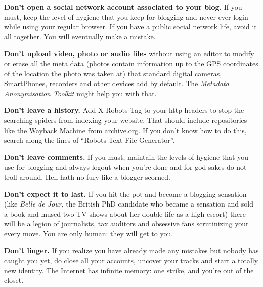 \textbf{Don't open a social network account associated to your blog.} If
you must, keep the level of hygiene that you keep for blogging and never
ever login while using your regular browser. If you have a public social
network life, avoid it all together. You will eventually make a mistake.

\textbf{Don't upload video, photo or audio files} without using an
editor to modify or erase all the meta data (photos contain information
up to the GPS coordinates of the location the photo was taken at) that
standard digital cameras, SmartPhones, recorders and other devices add
by default. The \emph{Metadata Anonymisation Toolkit} might help you
with that.

\textbf{Don't leave a history.} Add X-Robots-Tag to your http headers to
stop the searching spiders from indexing your website. That should
include repositories like the Wayback Machine from archive.org. If you
don't know how to do this, search along the lines of ``Robots Text File
Generator''.

\textbf{Don't leave comments.} If you must, maintain the levels of
hygiene that you use for blogging and always logout when you're done and
for god sakes do not troll around. Hell hath no fury like a blogger
scorned.

\textbf{Don't expect it to last.} If you hit the pot and become a
blogging sensation (like \emph{Belle de Jour}, the British PhD candidate
who became a sensation and sold a book and mused two TV shows about her
double life as a high escort) there will be a legion of journalists, tax
auditors and obsessive fans scrutinizing your every move. You are only
human: they will get to you.

\textbf{Don't linger.} If you realize you have already made any mistakes
but nobody has caught you yet, do close all your accounts, uncover your
tracks and start a totally new identity. The Internet has infinite
memory: one strike, and you're out of the closet.
